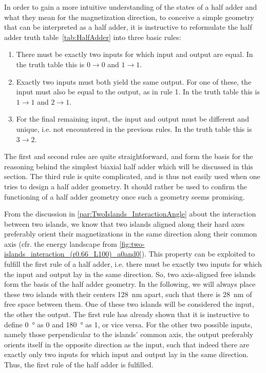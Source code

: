 \documentclass[11pt,a4paper,english,twoside]{article}
\begin{document}
In order to gain a more intuitive understanding of the states of a half adder and what they mean for the magnetization direction, to conceive a simple geometry that can be interpreted as a half adder, it is instructive to reformulate the half adder truth table~\ref{tab:HalfAdder} into three basic rules:
\begin{enumerate}
    \item There must be exactly two inputs for which input and output are equal. In the truth table this is $0\rightarrow0$ and $1\rightarrow1$.
    \item Exactly two inputs must both yield the same output. For one of these, the input must also be equal to the output, as in rule 1. In the truth table this is $1\rightarrow1$ and $2\rightarrow1$.
    \item For the final remaining input, the input and output must be different and unique, i.e. not encountered in the previous rules. In the truth table this is $3\rightarrow2$.
\end{enumerate}
The first and second rules are quite straightforward, and form the basis for the reasoning behind the simplest biaxial half adder which will be discussed in this section. The third rule is quite complicated, and is thus not easily used when one tries to design a half adder geometry. It should rather be used to confirm the functioning of a half adder geometry once such a geometry seems promising. \par
From the discussion in \cref{par:TwoIslands_InteractionAngle} about the interaction between two islands, we know that two islands aligned along their hard axes preferably orient their magnetizations in the same direction along their common axis (cfr. the energy landscape from \cref{fig:two-islands_interaction_(r0.66_L100)_a0and0}). This property can be exploited to fulfill the first rule of a half adder, i.e. there must be exactly two inputs for which the input and output lay in the same direction. So, two axis-aligned free islands form the basis of the half adder geometry. In the following, we will always place these two islands with their centers \SI{128}{\nano\metre} apart, such that there is \SI{28}{\nano\metre} of free space between them. One of these two islands will be considered the input, the other the output. The first rule has already shown that it is instructive to define \SI{0}{\degree} as 0 and \SI{180}{\degree} as 1, or vice versa. For the other two possible inputs, namely those perpendicular to the islands' common axis, the output preferably orients itself in the opposite direction as the input, such that indeed there are exactly only two inputs for which input and output lay in the same direction. Thus, the first rule of the half adder is fulfilled. \par
\end{document}
